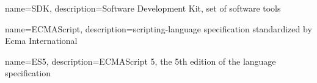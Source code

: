 {
	name=SDK,
	description={Software Development Kit, set of software tools}
}

{
	name=ECMAScript,
	description={scripting-language specification standardized by Ecma International}
}

{
	name=ES5,
	description={ECMAScript 5, the 5th edition of the language specification}
}